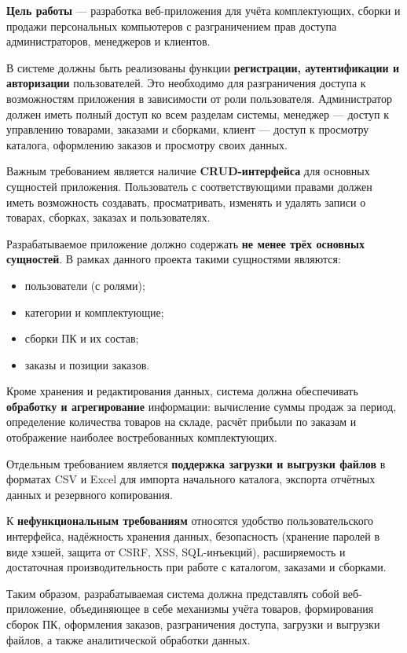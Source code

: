 \textbf{Цель работы} --- разработка веб-приложения для учёта комплектующих, сборки и продажи персональных компьютеров с разграничением прав доступа администраторов, менеджеров и клиентов.

В системе должны быть реализованы функции \textbf{регистрации, аутентификации и авторизации} пользователей. Это необходимо для разграничения доступа к возможностям приложения в зависимости от роли пользователя. Администратор должен иметь полный доступ ко всем разделам системы, менеджер --- доступ к управлению товарами, заказами и сборками, клиент --- доступ к просмотру каталога, оформлению заказов и просмотру своих данных.

Важным требованием является наличие \textbf{CRUD-интерфейса} для основных сущностей приложения. Пользователь с соответствующими правами должен иметь возможность создавать, просматривать, изменять и удалять записи о товарах, сборках, заказах и пользователях.

Разрабатываемое приложение должно содержать \textbf{не менее трёх основных сущностей}. В рамках данного проекта такими сущностями являются:
\begin{itemize}
    \item пользователи (с ролями);
    \item категории и комплектующие;
    \item сборки ПК и их состав;
    \item заказы и позиции заказов.
\end{itemize}

Кроме хранения и редактирования данных, система должна обеспечивать \textbf{обработку и агрегирование} информации: вычисление суммы продаж за период, определение количества товаров на складе, расчёт прибыли по заказам и отображение наиболее востребованных комплектующих.

Отдельным требованием является \textbf{поддержка загрузки и выгрузки файлов} в форматах CSV и Excel для импорта начального каталога, экспорта отчётных данных и резервного копирования.

К \textbf{нефункциональным требованиям} относятся удобство пользовательского интерфейса, надёжность хранения данных, безопасность (хранение паролей в виде хэшей, защита от CSRF, XSS, SQL-инъекций), расширяемость и достаточная производительность при работе с каталогом, заказами и сборками.

Таким образом, разрабатываемая система должна представлять собой веб-приложение, объединяющее в себе механизмы учёта товаров, формирования сборок ПК, оформления заказов, разграничения доступа, загрузки и выгрузки файлов, а также аналитической обработки данных.
